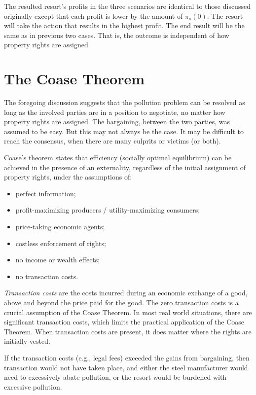 \documentclass[
]{book}
\providecommand{\tightlist}{%
  \setlength{\itemsep}{0pt}\setlength{\parskip}{0pt}}
\begin{document}
The resulted resort's profits in the three scenarios are identical to those discussed originally except that each profit is lower by the amount of \(\pi_s(0)\). The resort will take the action that results in the highest profit. The end result will be the same as in previous two cases. That is, the outcome is independent of how property rights are assigned.

\hypertarget{the-coase-theorem}{%
\section{The Coase Theorem}\label{the-coase-theorem}}

The foregoing discussion suggests that the pollution problem can be resolved as long as the involved parties are in a position to negotiate, no matter how property rights are assigned. The bargaining, between the two parties, was assumed to be easy. But this may not always be the case. It may be difficult to reach the consensus, when there are many culprits or victims (or both).

Coase's theorem states that efficiency (socially optimal equilibrium) can be achieved in the presence of an externality, regardless of the initial assignment of property rights, under the assumptions of:

\begin{itemize}
\tightlist
\item
  perfect information;
\item
  profit-maximizing producers / utility-maximizing consumers;
\item
  price-taking economic agents;
\item
  costless enforcement of rights;
\item
  no income or wealth effects;
\item
  no transaction costs.
\end{itemize}

\emph{Transaction costs} are the costs incurred during an economic exchange of a good, above and beyond the price paid for the good. The zero transaction costs is a crucial assumption of the Coase Theorem. In most real world situations, there are significant transaction costs, which limits the practical application of the Coase Theorem. When transaction costs are present, it does matter where the rights are initially vested.

If the transaction costs (e.g., legal fees) exceeded the gains from bargaining, then transaction would not have taken place, and either the steel manufacturer would need to excessively abate pollution, or the resort would be burdened with excessive pollution.
\end{document}
